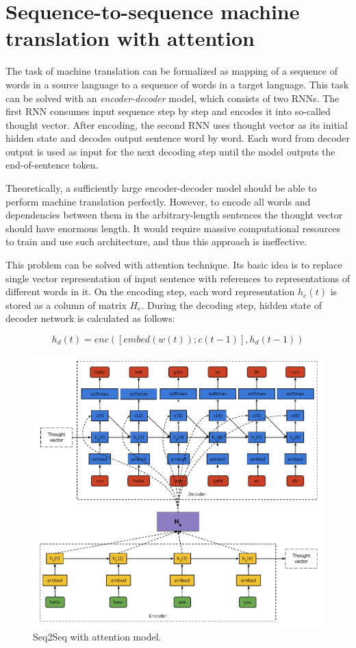 \section{Sequence-to-sequence machine translation with attention}
The task of machine translation can be formalized as mapping of a sequence of words in a source language to a sequence of words in a target language. This task can be solved with an \emph{encoder-decoder} model, which consists of two RNNs. The first RNN consumes input sequence step by step and encodes it into so-called thought vector. After encoding, the second RNN uses thought vector as its initial hidden state and decodes output sentence word by word.  Each word from decoder output is used as input for the next decoding step until the model outputs the end-of-sentence token. 

Theoretically, a sufficiently large encoder-decoder model should be able to perform machine translation perfectly. However, to encode all words and dependencies between them in the arbitrary-length sentences the thought vector should have enormous length. It would require massive computational resources to train and use such architecture, and thus this approach is ineffective.

This problem can be solved with attention technique. Its basic idea is to replace single vector representation of input sentence with references to representations of different words in it. On the encoding step, each word representation $h_e(t)$ is stored as a column of matrix $H_e$. During the decoding step, hidden state of decoder network is calculated as follows:

\begin{equation}
h_d(t) = enc([embed(w(t));c(t-1)], h_d(t-1))
\label{attn:hd}
\end{equation}

\begin{figure}
\centering
\includegraphics[width=5in]{Figures/seq2seq.pdf}
\decoRule
\caption[Seq2Seq model]{Seq2Seq with attention model.}
\label{fig:seq2seq}
\end{figure}

